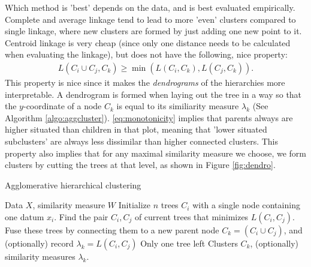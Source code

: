 \documentclass{article}
\begin{document}
Which method is 'best' depends on the data, and is best evaluated empirically. Complete and average linkage tend to lead to more 'even' clusters compared to single linkage, where new clusters are formed by just adding one new point to it. Centroid linkage is very cheap (since only one distance needs to be calculated when evaluating the linkage), but does not have the following, nice property:
\begin{align} \label{eq:monotonicity}
    L(C_i \cup C_j,C_k) \geq \min (L(C_i,C_k), L(C_j,C_k)).
\end{align}
This property is nice since it makes the \emph{dendrograms} of the hierarchies more interpretable. A dendrogram is formed when laying out the tree in a way so that the $y$-coordinate of a node $C_k$ is equal to its similiarity measure $\lambda_k$ (See Algorithm \ref{algo:aggcluster}). \eqref{eq:monotonicity} implies that parents always are higher situated than children in that plot, meaning that 'lower situated subclusters' are always less dissimilar than higher connected clusters. This property also implies that for any maximal similarity measure we choose, we form clusters by cutting the trees at that level, as shown in Figure \ref{fig:dendro}.

\begin{algorithm}[tb]     
	\caption{Agglomerative hierarchical clustering \label{algo:aggcluster}} 
	\begin{algorithmic} [1]
 		\REQUIRE Data $X$, similarity measure $W$
 		\STATE Initialize $n$ trees $C_i$ with a single node containing one datum $x_i$.
 		\REPEAT
 			\STATE Find the pair $C_i,C_j$ of current trees that minimizes $L(C_i,C_j)$. 
            \STATE Fuse these trees by connecting them to a new parent node $C_{k}=(C_i \cup C_j)$, and (optionally) record $\lambda_k =L(C_i, C_j) $
 		\UNTIL Only one tree left
 		\RETURN Clusters $C_k$, (optionally) similarity measures $\lambda_k$.
	\end{algorithmic}
\end{algorithm}
\end{document}
